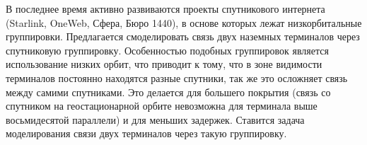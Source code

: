 В последнее время активно развиваются проекты спутникового интернета (Starlink, OneWeb, Сфера, Бюро 1440), в основе которых лежат низкорбитальные группировки. Предлагается смоделировать связь двух наземных терминалов через спутниковую группировку. Особенностью подобных группировок является использование низких орбит, что приводит к тому, что в зоне видимости терминалов постоянно находятся разные спутники, так же это осложняет связь между самими спутниками. Это делается для большего покрытия (связь со спутником на геостационарной орбите невозможна для терминала выше восьмидесятой параллели) и для меньших задержек. Ставится задача моделирования связи двух терминалов через такую группировку.